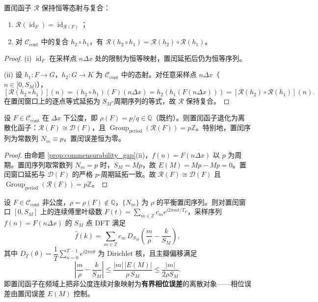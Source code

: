 \begin{theorem}[置闰函子的函子性]\label{thm:intercalation_functoriality}
置闰函子 $\mathcal{R}$ 保持恒等态射与复合：
\begin{enumerate}[label=(\roman*)]
    \item $\mathcal{R}(\operatorname{id}_F)=\operatorname{id}_{\mathcal{R}(F)}$；
    \item 对 $\mathcal{C}_{\text{cont}}$ 中的复合 $h_2\circ h_1$，有 $\mathcal{R}(h_2\circ h_1)=\mathcal{R}(h_2)\circ\mathcal{R}(h_1)$。
\end{enumerate}
\end{theorem}

\begin{proof}
(i) $\operatorname{id}_F$ 在采样点 $n\Delta x$ 处的限制为恒等映射，置闰延拓后仍为恒等序列。

(ii) 设 $h_1:F\to G$，$h_2:G\to K$ 为 $\mathcal{C}_{\text{cont}}$ 中的态射。对任意采样点 $n\Delta x$（$n\in[0,S_M)$），
\[
[\mathcal{R}(h_2\circ h_1)](n)=(h_2\circ h_1)(F)(n\Delta x)=h_2(h_1(F(n\Delta x)))=[\mathcal{R}(h_2)\circ\mathcal{R}(h_1)](n).
\]
在置闰窗口上的逐点等式延拓为 $S_M$-周期序列的等式，故 $\mathcal{R}$ 保持复合。
\end{proof}

\begin{proposition}[公度情形的退化]\label{prop:intercalation_rational_degeneracy}
设 $F\in\mathcal{C}_{\text{cont}}$ 在 $\Delta x$ 下公度，即 $\rho(F)=p/q\in\mathbb{Q}$（既约）。则置闰函子退化为离散化函子：$\mathcal{R}(F)\cong\mathcal{D}(F)$，且 $\operatorname{Group}_{\mathrm{period}}(\mathcal{R}(F))=p\mathbb{Z}$。特别地，置闰序列为常数列 $N_m\equiv p$，置闰误差恒为零。
\end{proposition}

\begin{proof}
由命题 \ref{prop:commensurability_gap}(ii)，$f(n)=F(n\Delta x)$ 以 $p$ 为周期。置闰序列取常数列 $N_m=p$ 时，$S_M=Mp$，故 $E(M)=Mp-Mp=0$。置闰窗口延拓与 $\mathcal{D}(F)$ 的严格 $p$-周期延拓一致。故 $\mathcal{R}(F)\cong\mathcal{D}(F)$ 且 $\operatorname{Group}_{\mathrm{period}}(\mathcal{R}(F))=p\mathbb{Z}$。
\end{proof}

\begin{theorem}[置闰函子的相位修正]\label{thm:intercalation_phase_correction}
设 $F\in\mathcal{C}_{\text{cont}}$ 非公度，$\rho=\rho(F)\notin\mathbb{Q}$，$\{N_m\}$ 为 $\rho$ 的平衡置闰序列。则对置闰窗口 $[0,S_M]$ 上的连续傅里叶级数 $\displaystyle F(t)=\sum_{m\in\mathbb{Z}}c_m e^{i2\pi mt/T_F}$，采样序列 $f(n)=F(n\Delta x)$ 的 $S_M$ 点 DFT 满足
\[
\hat{f}(k)=\sum_{m\in\mathbb{Z}}c_m\,D_{S_M}\!\left(\frac{m}{\rho}-\frac{k}{S_M}\right),
\]
其中 $D_T(\theta)=\dfrac{1}{T}\sum_{n=0}^{T-1}e^{i2\pi n\theta}$ 为 Dirichlet 核，且主瓣偏移满足
\[
\left|\frac{m}{\rho}-\frac{k}{S_M}\right|\le\frac{|m|\,|E(M)|}{\rho\,S_M}\le\frac{|m|}{2\rho S_M}.
\]
即置闰函子在频域上把非公度连续对象映射为\textbf{有界相位误差}的离散对象——相位误差由置闰误差 $E(M)$ 控制。
\end{theorem}

